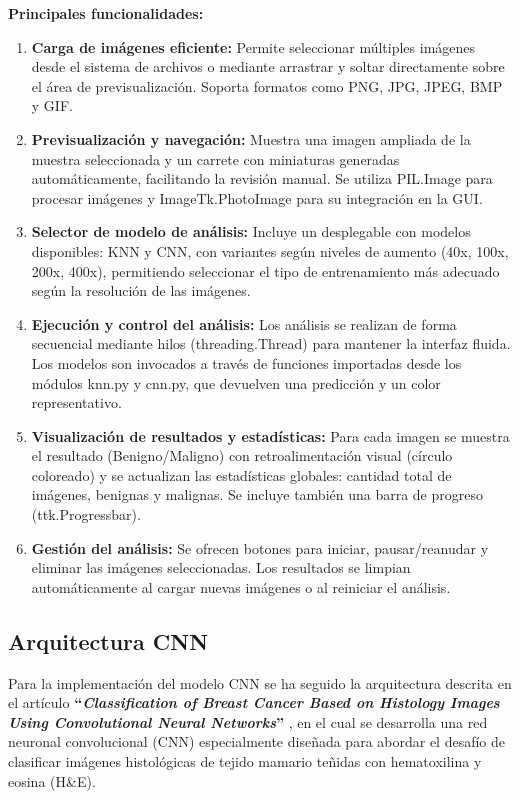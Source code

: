 \documentclass[12pt]{article} %
\begin{document}
\textbf{Principales funcionalidades:} 

\begin{enumerate}
    \item \textbf{Carga de imágenes eficiente:}  Permite seleccionar múltiples imágenes desde el sistema de archivos o mediante arrastrar y soltar directamente sobre el área de previsualización. Soporta formatos como PNG, JPG, JPEG, BMP y GIF.

    \item \textbf{Previsualización y navegación:} Muestra una imagen ampliada de la muestra seleccionada y un carrete con miniaturas generadas automáticamente, facilitando la revisión manual. Se utiliza \textcolor[HTML]{006400}{PIL.Image} para procesar imágenes y \textcolor[HTML]{006400}{ImageTk.PhotoImage} para su integración en la GUI.
    \item \textbf{Selector de modelo de análisis:} Incluye un desplegable con modelos disponibles: KNN y CNN, con variantes según niveles de aumento (40x, 100x, 200x, 400x), permitiendo seleccionar el tipo de entrenamiento más adecuado según la resolución de las imágenes.
    \item \textbf{Ejecución y control del análisis:} 
    Los análisis se realizan de forma secuencial mediante hilos (\textcolor[HTML]{006400}{threading.Thread}) para mantener la interfaz fluida. Los modelos son invocados a través de funciones importadas desde los módulos \textcolor[HTML]{006400}{knn.py} y \textcolor[HTML]{006400}{cnn.py}, que devuelven una predicción y un color representativo.
    \item \textbf{Visualización de resultados y estadísticas:}
    Para cada imagen se muestra el resultado (Benigno/Maligno) con retroalimentación visual (círculo coloreado) y se actualizan las estadísticas globales: cantidad total de imágenes, benignas y malignas. Se incluye también una barra de progreso (\textcolor[HTML]{006400}{ttk.Progressbar}).
    \item \textbf{Gestión del análisis:} 
    Se ofrecen botones para iniciar, pausar/reanudar y eliminar las imágenes seleccionadas. Los resultados se limpian automáticamente al cargar nuevas imágenes o al reiniciar el análisis.
\end{enumerate}

\subsection{Arquitectura CNN}
Para la implementación del modelo CNN se ha seguido la arquitectura descrita en el artículo \textbf{“\textit{Classification of Breast Cancer Based on Histology Images Using Convolutional Neural Networks}”} \cite{bardou2018classification}, en el cual se desarrolla una red neuronal convolucional (CNN) especialmente diseñada para abordar el desafío de clasificar imágenes histológicas de tejido mamario teñidas con hematoxilina y eosina (H\&E).\\
\end{document}
